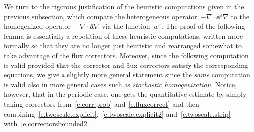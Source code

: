 \documentclass[11pt,twoside]{article} %
\numberwithin{equation}{section}
\theoremstyle{definition}
\newcommand{\eps}{\varepsilon}
\newcommand{\ep}{\eps}
\renewcommand{\a}{\mathbf{a}}
\newcommand{\ahom}{\bar{\a}}
\begin{document}
We turn to the rigorous justification of the heuristic computations given in the previous subsection, which compare the heterogeneous operator~$-\nabla \cdot \a^\ep\nabla$ to the homogenized operator~$-\nabla\cdot \ahom\nabla$ via the function~$w^\ep$. The proof of the following lemma is essentially a repetition of these heuristic computations, written more formally so that they are no longer just heuristic and rearranged somewhat to take advantage of the flux correctors. Moreover, since the following computation is valid provided that the corrector and flux correctors satisfy the corresponding equations, we give a slightly more general statement since the \emph{same} computation is valid also in more general cases such as \emph{stochastic homogenization}.  Notice, however, that in the periodic case, one gets the quantitative estimate by simply taking correctors from~\eqref{e.corr.prob} and~\eqref{e.fluxcorrect} and then combining~\eqref{e.twoscale.explicit},~\eqref{e.twoscale.explicit2} and~\eqref{e.twoscale.strip} with~\eqref{e.correctorsbounded2}. 
\end{document}
